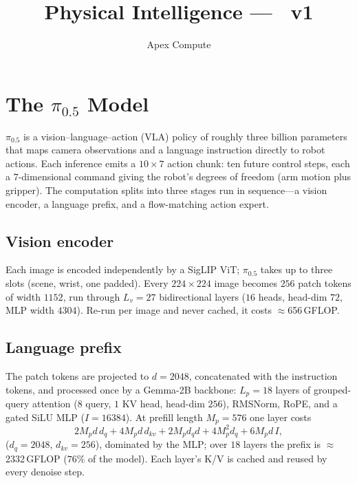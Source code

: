 \documentclass[11pt]{article}
\title{\vspace{-2em}Physical Intelligence \pizero{} --- \ue{}~v1}
\author{Apex Compute}
\date{\vspace{-1em}}
\newcommand{\pizero}{$\pi_{0.5}$}
\begin{document}
\maketitle

\section{The \pizero{} Model}
\label{sec:model}
\pizero{} is a vision--language--action (VLA) policy of roughly three billion
parameters that maps camera observations and a language instruction directly to
robot actions. Each inference emits a $10{\times}7$ action chunk: ten future
control steps, each a $7$-dimensional command giving the robot's degrees of
freedom (arm motion plus gripper). The computation splits into three stages run
in sequence---a vision encoder, a language prefix, and a flow-matching action
expert.

\subsection{Vision encoder}
Each image is encoded independently by a SigLIP ViT; \pizero{} takes up to three
slots (scene, wrist, one padded). Every $224{\times}224$ image becomes $256$
patch tokens of width $1152$, run through $L_v{=}27$ bidirectional layers
($16$ heads, head-dim $72$, MLP width $4304$). Re-run per image and never
cached, it costs $\approx$656\,GFLOP.

\subsection{Language prefix}
The patch tokens are projected to $d{=}2048$, concatenated with the instruction
tokens, and processed once by a Gemma-2B backbone: $L_p{=}18$ layers of
grouped-query attention ($8$ query, $1$ KV head, head-dim $256$), RMSNorm, RoPE,
and a gated SiLU MLP ($I{=}16384$). At prefill length $M_p{=}576$ one layer costs
\begin{equation}
2 M_p d\, d_{q} + 4 M_p d\, d_{kv} + 2 M_p d_{q} d
+ 4 M_p^2 d_{q} + 6 M_p d\, I ,
\end{equation}
($d_q{=}2048$, $d_{kv}{=}256$), dominated by the MLP; over $18$ layers the
prefix is $\approx$2332\,GFLOP ($76\%$ of the model). Each layer's K/V is cached
and reused by every denoise step.
\end{document}
